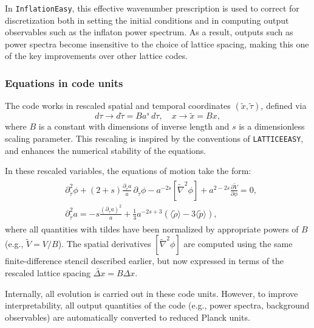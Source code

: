 \documentclass[aps, nofootinbib,superscriptaddress, preprintnumbers, longbibliography]{article}
\begin{document}
In \texttt{InflationEasy}, this effective wavenumber prescription is used to correct for discretization both in setting the initial conditions and in computing output observables such as the inflaton power spectrum. As a result, outputs such as power spectra become insensitive to the choice of lattice spacing, making this one of the key improvements over other lattice codes.

\subsubsection{Equations in code units}

The code works in rescaled spatial and temporal coordinates $(\tilde{x}, \tilde{\tau})$, defined via
\begin{equation}
\label{eq:rescaling}
d\tau \rightarrow d\tilde{\tau} = B a^s\, d\tau, \quad x \rightarrow \tilde{x} = Bx,
\end{equation}
where $B$ is a constant with dimensions of inverse length and $s$ is a dimensionless scaling parameter. This rescaling is inspired by the conventions of \texttt{LATTICEEASY}, and enhances the numerical stability of the equations.

In these rescaled variables, the equations of motion take the form:
\begin{align}
\label{eq:eoms}
\begin{split}
&\partial_{\tilde{\tau}}^2 \phi + (2 + s)\frac{\partial_{\tilde{\tau}} a}{a} \, \partial_{\tilde{\tau}} \phi - a^{-2s} [\tilde{\nabla}^2 \phi] + a^{2 - 2s} \frac{\partial \tilde{V}}{\partial \phi} = 0,\\
&\partial_{\tilde{\tau}}^2 a = -s \frac{(\partial_{\tilde{\tau}} a)^2}{a} + \frac{1}{3} a^{-2s + 3} \left( \langle \tilde{\rho} \rangle - 3 \langle \tilde{p} \rangle \right),
\end{split}
\end{align}
where all quantities with tildes have been normalized by appropriate powers of $B$ (e.g., $\tilde{V} = V / B$). The spatial derivatives $[\tilde{\nabla}^2 \phi]$ are computed using the same finite-difference stencil described earlier, but now expressed in terms of the rescaled lattice spacing $\tilde{\Delta x} = B\Delta x$.

Internally, all evolution is carried out in these code units. However, to improve interpretability, all output quantities of the code (e.g., power spectra, background observables) are automatically converted to reduced Planck units.
\end{document}
